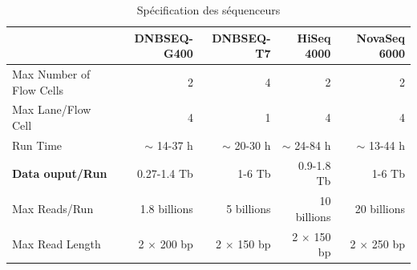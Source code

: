 \begin{table}[H]
\begin{tabular}{ |p{5cm}||r|r|r|r| }
    \hline
    & \footnotesize{DNBSEQ-G400} & \footnotesize{DNBSEQ-T7} & \footnotesize{HiSeq 4000} & \footnotesize{NovaSeq 6000} \\\hline\hline
    Max Number of Flow Cells & 2 & 4 & 2 & 2 \\\hline
    Max Lane/Flow Cell & 4 & 1 & 4 & 4 \\\hline
    Run Time & $\sim$ 14-37 h & $\sim$ 20-30 h & $\sim$ 24-84 h & $\sim$ 13-44 h \\\hline
    \textbf{Data ouput/Run} & 0.27-1.4 Tb & 1-6 Tb & 0.9-1.8 Tb & 1-6 Tb \\\hline
    Max Reads/Run & 1.8 billions & 5 billions & 10 billions & 20 billions \\\hline
    Max Read Length & 2 $\times$ 200 bp & 2 $\times$ 150 bp & 2 $\times$ 150 bp & 2 $\times$ 250 bp \\\hline
\end{tabular}
    \caption{Spécification des séquenceurs}
    \label{spe-seq}
\end{table}

